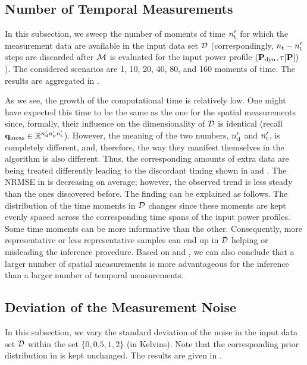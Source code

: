 \subsection{Number of Temporal Measurements}
In this subsection, we sweep the number of moments of time ${n_\text{t}'}$ for which the measurement data are available in the input data set $\mathcal{D}$ (correspondingly, ${n_\text{t}} - {n_\text{t}'}$ steps are discarded after $\model$ is evaluated for the input power profile $(\mathbf{P}_{\text{dyn}}, \tau[\mathbf{P}])$). The considered scenarios are 1, 10, 20, 40, 80, and 160 moments of time. The results are aggregated in .


As we see, the growth of the computational time is relatively low. One might have expected this time to be the same as the one for the spatial measurements since, formally, their influence on the dimensionality of $\mathcal{D}$ is identical (recall $\mathbf{q}_{\text{meas}} \in \mathbb{R}^{{n_\text{d}'} {n_\text{p}'} {n_\text{t}'}}$). However, the meaning of the two numbers, ${n_\text{d}'}$ and ${n_\text{t}'}$, is completely different, and, therefore, the way they manifest themselves in the algorithm is also different. Thus, the corresponding amounts of extra data are being treated differently leading to the discordant timing shown in  and .
The NRMSE in  is decreasing on average; however, the observed trend is less steady than the ones discovered before. The finding can be explained as follows. The distribution of the time moments in $\mathcal{D}$ changes since these moments are kept evenly spaced across the corresponding time spans of the input power profiles. Some time moments can be more informative than the other. Consequently, more representative or less representative samples can end up in $\mathcal{D}$ helping or misleading the inference procedure.
Based on  and , we can also conclude that a larger number of spatial measurements is more advantageous for the inference than a larger number of temporal measurements.

\subsection{Deviation of the Measurement Noise}
In this subsection, we vary the standard deviation of the noise in the input data set $\mathcal{D}$ within the set $\{ 0, 0.5, 1, 2 \}$ (in Kelvins). Note that the corresponding prior distribution in  is kept unchanged. The results are given in .


